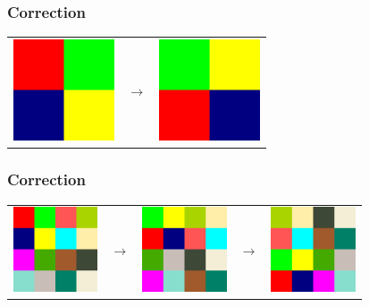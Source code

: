 \documentclass[svgnames,11pt]{beamer}
\begin{document}
\begin{frame}
    \frametitle{Correction}

    \begin{center}
        \begin{tabular}{ccc}
            \includegraphics[width=3cm]{ressources/carre1.png}
             & $$\rightarrow$$
             &
            \includegraphics[width=3cm]{ressources/carre1-rot.png}
            \\
        \end{tabular}
    \end{center}
\end{frame}
\begin{frame}
    \frametitle{Correction}

    \begin{center}
        \begin{tabular}{ccccc}
            \includegraphics[width=2.5cm]{ressources/carre2.png}
             & $$\rightarrow$$
             &
            \includegraphics[width=2.5cm]{ressources/carre2-int.png}
            & $$\rightarrow$$
             &
            \includegraphics[width=2.5cm]{ressources/carre2-rot.png}
            \\
        \end{tabular}
    \end{center}

\end{frame}
\end{document}
